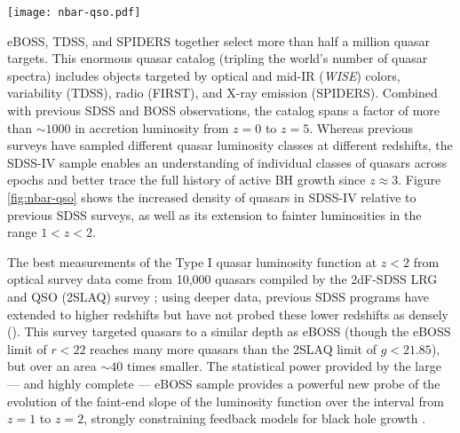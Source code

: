 \begin{figure*}[t!]
\centering
\texttt{[image: nbar-qso.pdf]}
\caption{ \label{fig:nbar-qso} Distribution of quasars in redshift and
rest-frame $i$-band absolute magnitude. Top panel: contours
show the density of Legacy and BOSS quasars in this plane from SDSS-I
through SDSS-III.  The grayscale represents the density of eBOSS,
TDSS, and SPIDERS quasars from SDSS-IV from the first year results. In
the range $1<z<2$ the SDSS-IV quasars probe much lower luminosities
than previous SDSS samples. The gray horizontal line corresponds to
$M_\ast$ for galaxies (\citealt{blanton04b}); the SDSS-IV quasars out
to $z\sim 2$ approach the faintness of Seyfert galaxies in optical
luminosity. Bottom panel: each histogram shows the density of
quasars as a function of redshift. The gray histogram is for Legacy
and BOSS quasars from SDSS-I through SDSS-III. The blue histogram
shows the estimated density of eBOSS quasars from the first year
results. In the range $1<z<2$ the eBOSS sample represents an increase
in density by factors of 5--10.}
\end{figure*}

eBOSS, TDSS, and SPIDERS together select more than half a million
quasar targets.  This enormous quasar catalog (tripling the world's
number of quasar spectra) includes objects targeted by optical and
mid-IR ({\it WISE}) colors, variability (TDSS), radio (FIRST), and
X-ray emission (SPIDERS).  Combined with previous SDSS and BOSS
observations, the catalog spans a factor of more than $\sim1000$ in
accretion luminosity from $z=0$ to $z=5$.  Whereas previous surveys
have sampled different quasar luminosity classes at different
redshifts, the SDSS-IV sample enables an understanding of individual
classes of quasars across epochs and better trace the full history of
active BH growth since $z\approx3$.  Figure \ref{fig:nbar-qso} shows
the increased density of quasars in SDSS-IV relative to previous SDSS
surveys, as well as its extension to fainter luminosities in the range
$1<z<2$.

The best measurements of the Type I quasar luminosity function at
$z<2$ from optical survey data come from 10,000 quasars compiled by
the 2dF-SDSS LRG and QSO (2SLAQ) survey \citep{croom09a}; using deeper
data, previous SDSS programs have extended to higher redshifts but
have not probed these lower redshifts as densely
(\citealt{palanquedelabrouille13a}). This survey targeted quasars to a
similar depth as eBOSS (though the eBOSS limit of $r<22$ reaches
many more quasars than the 2SLAQ limit of $g<21.85$), but over an area
$\sim40$ times smaller.  The statistical power provided by the large
--- and highly complete --- eBOSS sample provides a powerful new
probe of the evolution of the faint-end slope of the luminosity
function over the interval from $z=1$ to $z=2$, strongly constraining
feedback models for black hole growth \citep[e.g.,][]{hopkins06b}.

